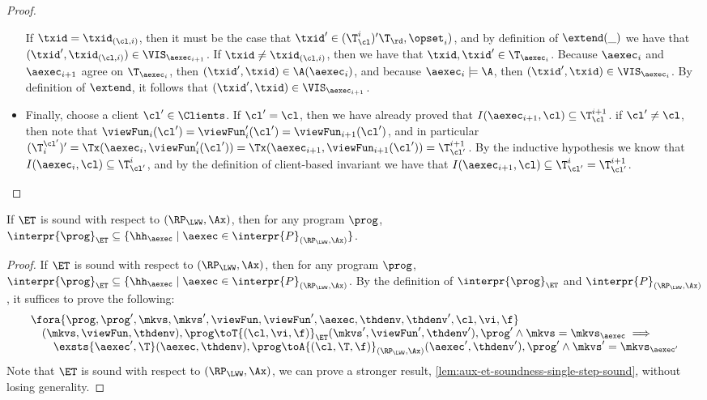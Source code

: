 \begin{proof}
\begin{itemize}
If $\txid = \txid_{(\cl, i)}$, then it must be the case that $\txid' \in (\T^{i}_{\cl})' \T_\rd, \opset_{i})$, 
and by definition of $\extend(\_)$ we have that $(\txid' ,\txid_{(\cl, i)}) \in \VIS_{\aexec_{i+1}}$. 
If $\txid \neq \txid_{(\cl, i)}$, then we have that $\txid, \txid' \in \T_{\aexec_{i}}$. Because 
$\aexec_{i}$ and $\aexec_{i+1}$ agree on $\T_{\aexec_{i}}$, then $(\txid', \txid) \in \A(\aexec_{i})$, 
and because $\aexec_{i} \models \A$, then $(\txid', \txid) \in \VIS_{\aexec_{i}}$. By definition of 
$\extend$, it follows that $(\txid', \txid) \in \VIS_{\aexec_{i+1}}$.

\item Finally, choose a client $\cl' \in \Clients$. If $\cl' = \cl$, then we have already proved that 
$I(\aexec_{i+1}, \cl) \subseteq \T_{\cl}^{i+1}$. 
if $\cl' \neq \cl$, then note that $\viewFun_{i}(\cl') = \viewFun'_{i}(\cl') = \viewFun_{i+1}(\cl')$, 
and in particular $(\T^{\cl'}_{i})' = \Tx(\aexec_{i}, \viewFun'_{i}(\cl')) = \Tx(\aexec_{i+1}, \viewFun_{i+1}(\cl')) =  \T_{\cl'}^{i+1}$.
By the inductive hypothesis we know that $I(\aexec_{i}, \cl) \subseteq \T_{\cl'}^{i}$, 
and by the definition of client-based invariant we have that $I(\aexec_{i+1}, \cl) \subseteq \T_{\cl'}^{i} = \T_{\cl'}^{i+1}$. 
\end{itemize}
\end{proof}

\begin{corollary}
\label{cor:et-soundness}
If $\ET$ is sound with respect to $(\RP_{\LWW}, \Ax)$, then 
for any program $\prog$, $\interpr{\prog}_{\ET} \subseteq \{ \hh_{\aexec} \mid \aexec \in \interpr{P}_{(\RP_{\LWW}, \Ax)} \}$.
\end{corollary}
\begin{proof}
If $\ET$ is sound with respect to $(\RP_{\LWW}, \Ax)$, then 
for any program $\prog$, $\interpr{\prog}_{\ET} \subseteq \{ \hh_{\aexec} \mid \aexec \in \interpr{P}_{(\RP_{\LWW}, \Ax)}$.
By the definition of \( \interpr{\prog}_{\ET} \) and \( \interpr{P}_{(\RP_{\LWW}, \Ax)} \), it suffices to prove the following:
\[
\begin{array}{@{}l@{}}
    \fora{\prog,\prog',\mkvs,\mkvs',\viewFun,\viewFun',\aexec,\thdenv,\thdenv',\cl,\vi,\f} \\
    \quad (\mkvs, \viewFun, \thdenv), \prog \toT{(\cl, \vi, \f)}_{\ET} (\mkvs', \viewFun', \thdenv'), \prog'
    \land \mkvs = \mkvs_{\aexec}
    \implies {} \\
    \qquad \exsts{\aexec',\T}
    (\aexec, \thdenv), \prog \toA{(\cl, \T, \f)}_{(\RP_{\LWW}, \Ax)} (\aexec', \thdenv'), \prog' 
    \land \mkvs' = \mkvs_{\aexec'}  
\end{array}
\]
Note that \( \ET \) is sound with respect to \( (\RP_{\LWW}, \Ax) \), we can prove a stronger result, \ie \cref{lem:aux-et-soundness-single-step-sound}, without losing generality.
\end{proof}


